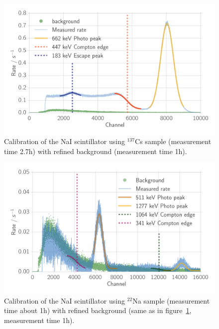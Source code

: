 \begin{figure}[htpb]
    \centering
    \includegraphics[width=0.9\linewidth]{./analysis/figures/histo_na_137cs}
    \caption{Calibration of the NaI scintillator using $^{137}$Cs sample (measurement
    time 2.7h) with refined background (measurement time 1h). }
\label{fig:histo_na_137cs}
\end{figure}

\begin{figure}[htpb]
    \centering
    \includegraphics[width=0.9\linewidth]{./analysis/figures/histo_na_22na}
    \caption{Calibration of the NaI scintillator using $^{22}$Na sample (measurement
        time about 1h) with refined background (same as in figure~\ref{fig:histo_na_137cs},
        measurement time 1h). }
\label{fig:histo_na_22na}
\end{figure}

